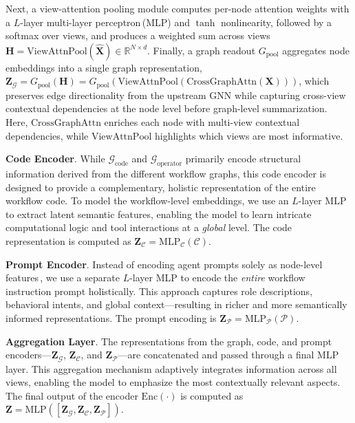 Next, a view-attention pooling module computes per-node attention weights with a $L$-layer multi-layer perceptron\,(MLP) and $\tanh$ nonlinearity, followed by a softmax over views, and produces a weighted sum across views $\mathbf{H} = \mathrm{ViewAttnPool}(\hat{\mathbf{X}})\in\mathbb{R}^{N\times d}$. Finally, a graph readout $G_{\mathrm{pool}}$ aggregates node embeddings into a single graph representation, $\mathbf{Z}_{\mathcal{G}} = G_{\mathrm{pool}}\!\left(\mathbf{H}\right) = G_{\mathrm{pool}}\!(\mathrm{ViewAttnPool}(\mathrm{CrossGraphAttn}(\mathbf{X})))$, which preserves edge directionality from the upstream GNN while capturing cross-view contextual dependencies at the node level before graph-level summarization. Here, $\mathrm{CrossGraphAttn}$ enriches each node with multi-view contextual dependencies, while $\mathrm{ViewAttnPool}$ highlights which views are most informative.

\textbf{Code Encoder}. While $\mathcal{G}_{\text{code}}$ and $\mathcal{G}_{\text{operator}}$ primarily encode structural information derived from the different workflow graphs, this code encoder is designed to provide a complementary, holistic representation of the entire workflow code. To model the workflow-level embeddings, we use an $L$-layer MLP to extract latent semantic features, enabling the model to learn intricate computational logic and tool interactions at a \emph{global} level. The code representation is computed as $\mathbf{Z}_{\mathcal{C}} = \mathrm{MLP}_\mathcal{C}(\mathcal{C})$.

\textbf{Prompt Encoder}. Instead of encoding agent prompts solely as node-level features\,\citep{FLORA_Bench_25}, we use a separate $L$-layer MLP to encode the \emph{entire} workflow instruction prompt holistically. This approach captures role descriptions, behavioral intents, and global context---resulting in richer and more semantically informed representations. The prompt encoding is $\mathbf{Z}_{\mathcal{P}} = \mathrm{MLP}_{\mathcal{P}}(\mathcal{P})$.

\textbf{Aggregation Layer}. The representations from the graph, code, and prompt encoders---$\mathbf{Z}_{\mathcal{G}}$, $\mathbf{Z}_{\mathcal{C}}$, and $\mathbf{Z}_{\mathcal{P}}$---are concatenated and passed through a final MLP layer. This aggregation mechanism adaptively integrates information across all views, enabling the model to emphasize the most contextually relevant aspects. The final output of the encoder $\mathrm{Enc}(\cdot)$ is computed as $\mathbf{Z} = \mathrm{MLP}([\mathbf{Z}_{\mathcal{G}}, \mathbf{Z}_{\mathcal{C}}, \mathbf{Z}_{\mathcal{P}}])$.

